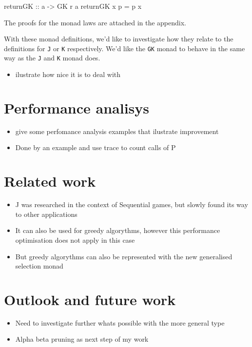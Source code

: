 \documentclass[runningheads]{llncs}
\providecommand{\tightlist}{%
  \setlength{\itemsep}{0pt}\setlength{\parskip}{0pt}}
\begin{document}
\begin{code}
returnGK :: a -> GK r a
returnGK x p = p x
\end{code}

The proofs for the monad laws are attached in the appendix.

With these monad definitions, we'd like to investigate how they relate
to the definitions for \texttt{J} or \texttt{K} respectively. We'd like
the \texttt{GK} monad to behave in the same way as the \texttt{J} and
\texttt{K} monad does.

\begin{itemize}
\tightlist
\item
  ilustrate how nice it is to deal with
\end{itemize}

\section{Performance analisys}\label{performance-analisys}

\begin{itemize}
\tightlist
\item
  give some perfomance analysis examples that ilustrate improvement
\item
  Done by an example and use trace to count calls of P
\end{itemize}

\section{Related work}\label{related-work}

\begin{itemize}
\item
  J was researched in the context of Sequential games, but slowly found
  its way to other applications
\item
  It can also be used for greedy algorythms, however this performance
  optimisation does not apply in this case
\item
  But greedy algorythms can also be represented with the new generalised
  selection monad
\end{itemize}

\section{Outlook and future work}\label{outlook-and-future-work}

\begin{itemize}
\tightlist
\item
  Need to investigate further whats possible with the more general type
\item
  Alpha beta pruning as next step of my work
\end{itemize}
\end{document}
